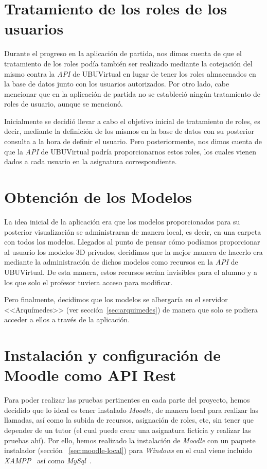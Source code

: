 
\section{Tratamiento de los roles de los usuarios}\label{sec:roles}
Durante el progreso en la aplicación de partida, nos dimos cuenta de que el tratamiento de los roles podía también ser realizado mediante la cotejación del mismo contra la \textit{API} de UBUVirtual en lugar de tener los roles almacenados en la base de datos junto con los usuarios autorizados. Por otro lado, cabe mencionar que en la aplicación de partida no se estableció ningún tratamiento de roles de usuario, aunque se mencionó.

Inicialmente se decidió llevar a cabo el objetivo inicial de tratamiento de roles, es decir, mediante la definición de los mismos en la base de datos con su posterior consulta a la hora de definir el usuario. Pero posteriormente, nos dimos cuenta de que la \textit{API} de UBUVirtual podría proporcionarnos estos roles, los cuales vienen dados a cada usuario en la asignatura correspondiente.

\section{Obtención de los Modelos}
La idea inicial de la aplicación era que los modelos proporcionados para su posterior visualización se administraran de manera local, es decir, en una carpeta con todos los modelos. Llegados al punto de pensar cómo podíamos proporcionar al usuario los modelos 3D privados, decidimos que la mejor manera de hacerlo era mediante la administración de dichos modelos como recursos en la \textit{API} de UBUVirtual. De esta manera, estos recursos  serían invisibles para el alumno y a los que solo el profesor tuviera acceso para modificar.

Pero finalmente, decidimos que los modelos se albergaría en el servidor <<Arquímedes>> (ver sección~\ref{sec:arquimedes}) de manera que solo se pudiera acceder a ellos a través de la aplicación.

\section{Instalación y configuración de Moodle como API Rest}
Para poder realizar las pruebas pertinentes en cada parte del proyecto, hemos decidido que lo ideal es tener instalado \textit{Moodle}, de manera local para realizar las llamadas, así como la subida de recursos, asignación de roles, etc, sin tener que depender de un tutor (el cual puede crear una asignatura ficticia y realizar las pruebas ahí). Por ello, hemos realizado la instalación de \textit{Moodle} con un paquete instalador (sección ~\ref{sec:moodle-local}) para \textit{Windows} en el cual viene incluido \textit{XAMPP}~\cite{wiki:xampp} así como \textit{MySql}~\cite{wiki:mysql}.

